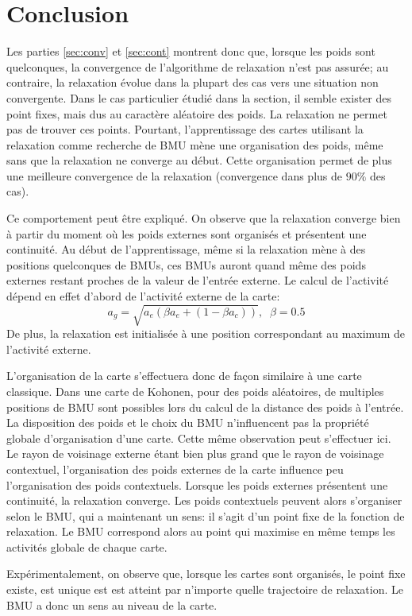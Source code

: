 \documentclass[../main]{subfiles}
\begin{document}
\section{Conclusion}

Les parties \ref{sec:conv} et \ref{sec:cont} montrent donc que, lorsque les poids sont quelconques, la convergence de l'algorithme de relaxation n'est pas assurée; au contraire, la relaxation évolue dans la plupart des cas vers une situation non convergente. Dans le cas particulier étudié dans la section, il semble exister des point fixes, mais dus au caractère aléatoire des poids. La relaxation ne permet pas de trouver ces points. Pourtant, l'apprentissage des cartes utilisant la relaxation comme recherche de BMU mène une organisation des poids, même sans que la relaxation ne converge au début. Cette organisation permet de plus une meilleure convergence de la relaxation (convergence dans plus de $90 \%$ des cas).

Ce comportement peut être expliqué. On observe que la relaxation converge bien à partir du moment où les poids externes sont organisés et présentent une continuité. 
Au début de l'apprentissage, même si la relaxation mène à des positions quelconques de BMUs, ces BMUs auront quand même des poids externes restant proches de la valeur de l'entrée externe. 
Le calcul de l'activité dépend en effet d'abord de l'activité externe de la carte:
$$ a_g = \sqrt{a_e ( \beta a_e + (1-\beta a_c))}, \;\; \beta=0.5$$ 
De plus, la relaxation est initialisée à une position correspondant au maximum de l'activité externe.

L'organisation de la carte s'effectuera donc de façon similaire à une carte classique. Dans une carte de Kohonen, pour des poids aléatoires, de multiples positions de BMU sont possibles lors du calcul de la distance des poids à l'entrée. La disposition des poids et le choix du BMU n'influencent pas la propriété globale d'organisation d'une carte. Cette même observation peut s'effectuer ici. 
Le rayon de voisinage externe étant bien plus grand que le rayon de voisinage contextuel, l'organisation des poids externes de la carte influence peu l'organisation des poids contextuels.
Lorsque les poids externes présentent une continuité, la relaxation converge. Les poids contextuels peuvent alors s'organiser selon le BMU, qui a maintenant un sens: il s'agit d'un point fixe de la fonction de relaxation. Le BMU correspond alors au point qui maximise en même temps les activités globale de chaque carte.

Expérimentalement, on observe que, lorsque les cartes sont organisés, le point fixe  existe, est unique est est atteint par n'importe quelle trajectoire de relaxation. Le BMU a donc un sens au niveau de la carte. 
\end{document}

